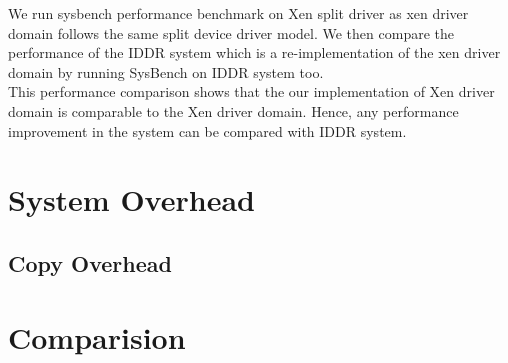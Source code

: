 We run sysbench performance benchmark on Xen split driver as xen driver domain follows the same split device driver model. We then compare the performance of the IDDR system which is a re-implementation of the xen driver domain by running SysBench on IDDR system too. 
\\
This performance comparison shows that the our implementation of Xen driver domain is comparable to the Xen driver domain. Hence, any performance improvement in the system can be compared with IDDR system.    


\section{System Overhead}
\subsection{Copy Overhead}
\pagebreak

\section {Comparision}
\pagebreak

